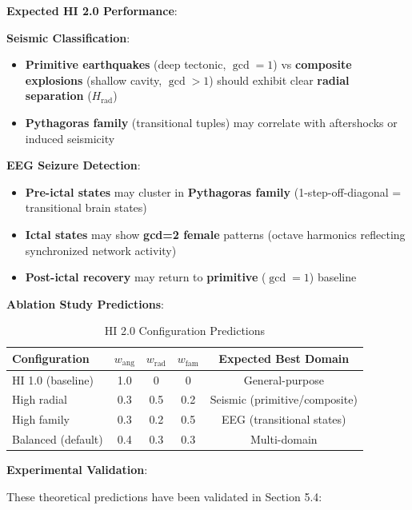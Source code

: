 \documentclass[11pt]{article}
\theoremstyle{remark}
\begin{document}
\textbf{Expected HI 2.0 Performance}:

\textbf{Seismic Classification}:
\begin{itemize}
\item \textbf{Primitive earthquakes} (deep tectonic, $\gcd=1$) vs \textbf{composite explosions} (shallow cavity, $\gcd>1$) should exhibit clear \textbf{radial separation} ($H_{\text{rad}}$)
\item \textbf{Pythagoras family} (transitional tuples) may correlate with aftershocks or induced seismicity
\end{itemize}

\textbf{EEG Seizure Detection}:
\begin{itemize}
\item \textbf{Pre-ictal states} may cluster in \textbf{Pythagoras family} (1-step-off-diagonal = transitional brain states)
\item \textbf{Ictal states} may show \textbf{gcd=2 female} patterns (octave harmonics reflecting synchronized network activity)
\item \textbf{Post-ictal recovery} may return to \textbf{primitive} ($\gcd=1$) baseline
\end{itemize}

\textbf{Ablation Study Predictions}:

\begin{table}[h]
\centering
\caption{HI 2.0 Configuration Predictions}
\label{tab:hi2_configs}
\begin{tabular}{lcccc}
\toprule
\textbf{Configuration} & $w_{\text{ang}}$ & $w_{\text{rad}}$ & $w_{\text{fam}}$ & \textbf{Expected Best Domain} \\
\midrule
HI 1.0 (baseline) & 1.0 & 0 & 0 & General-purpose \\
High radial & 0.3 & 0.5 & 0.2 & Seismic (primitive/composite) \\
High family & 0.3 & 0.2 & 0.5 & EEG (transitional states) \\
Balanced (default) & 0.4 & 0.3 & 0.3 & Multi-domain \\
\bottomrule
\end{tabular}
\end{table}

\textbf{Experimental Validation}:

These theoretical predictions have been validated in Section 5.4:
\end{document}
